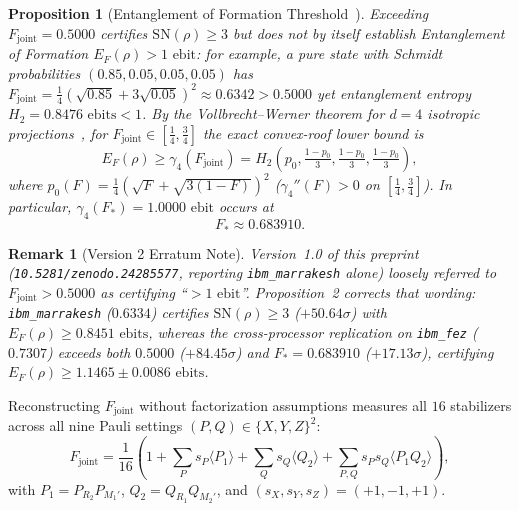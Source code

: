 \documentclass[11pt,twocolumn]{article}
\newtheorem{proposition}{Proposition}
\newtheorem{remark}{Remark}
\begin{document}
\begin{proposition}[Entanglement of Formation Threshold~\cite{VollbrechtWerner2001}]
Exceeding $F_{\mathrm{joint}}=0.5000$ certifies $\mathrm{SN}(\rho)\ge 3$ but does \emph{not} by itself establish Entanglement of Formation $E_F(\rho)>1\text{ ebit}$: for example, a pure state with Schmidt probabilities $(0.85, 0.05, 0.05, 0.05)$ has $F_{\mathrm{joint}}=\frac{1}{4}(\sqrt{0.85}+3\sqrt{0.05})^2 \approx 0.6342 > 0.5000$ yet entanglement entropy $H_2 = 0.8476\text{ ebits} < 1$. By the Vollbrecht--Werner theorem for $d=4$ isotropic projections~\cite{VollbrechtWerner2001}, for $F_{\mathrm{joint}}\in[\frac{1}{4},\frac{3}{4}]$ the exact convex-roof lower bound is
\begin{equation}
E_F(\rho) \ge \gamma_4(F_{\mathrm{joint}}) = H_2\!\left(p_0, \tfrac{1-p_0}{3}, \tfrac{1-p_0}{3}, \tfrac{1-p_0}{3}\right),
\label{eq:ef_bound}
\end{equation}
where $p_0(F) = \frac{1}{4}(\sqrt{F}+\sqrt{3(1-F)})^2$ ($\gamma_4''(F)>0$ on $[\frac{1}{4},\frac{3}{4}]$). In particular, $\gamma_4(F_*) = 1.0000\text{ ebit}$ occurs at
\begin{equation}
F_* \approx 0.683910.
\label{eq:fstar}
\end{equation}
\end{proposition}

\begin{remark}[Version 2 Erratum Note]
Version~1.0 of this preprint (\texttt{10.5281/zenodo.24285577}, reporting \texttt{ibm\_marrakesh} alone) loosely referred to $F_{\mathrm{joint}}>0.5000$ as certifying ``$>1\text{ ebit}$''. Proposition~2 corrects that wording: \texttt{ibm\_marrakesh} ($0.6334$) certifies $\mathrm{SN}(\rho)\ge 3$ ($+50.64\sigma$) with $E_F(\rho)\ge 0.8451\text{ ebits}$, whereas the cross-processor replication on \texttt{ibm\_fez} ($0.7307$) exceeds both $0.5000$ ($+84.45\sigma$) and $F_*=0.683910$ ($+17.13\sigma$), certifying $E_F(\rho)\ge 1.1465 \pm 0.0086\text{ ebits}$.
\end{remark}

Reconstructing $F_{\mathrm{joint}}$ without factorization assumptions measures all $16$ stabilizers across all nine Pauli settings $(P,Q)\in\{X,Y,Z\}^2$:
\begin{equation}
F_{\mathrm{joint}} = \frac{1}{16}\!\left(1 + \sum_{P} s_P\langle P_1\rangle + \sum_{Q} s_Q\langle Q_2\rangle + \sum_{P,Q} s_P s_Q\langle P_1 Q_2\rangle\right)\!,
\label{eq:fjoint}
\end{equation}
with $P_1 = P_{R_2}P_{M_1'}$, $Q_2 = Q_{R_1}Q_{M_2'}$, and $(s_X, s_Y, s_Z) = (+1, -1, +1)$.
\end{document}
